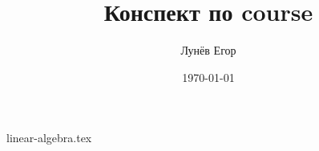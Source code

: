 \documentclass[12pt]{article}
\date{\today}
\author{Лунёв Егор}
\title{Конспект по course}
\begin{document}
\maketitle
\tableofcontents
\pagebreak

{linear-algebra.tex}
\end{document}
